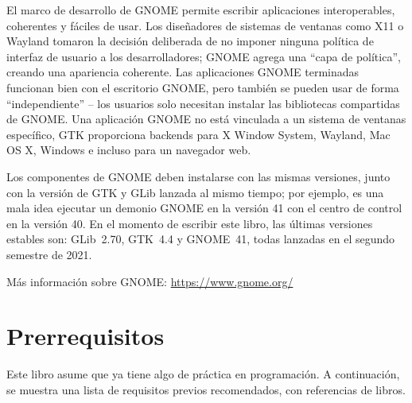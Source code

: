 El marco de desarrollo de GNOME permite escribir aplicaciones interoperables, coherentes y fáciles de usar. Los diseñadores de sistemas de ventanas como X11 o Wayland tomaron la decisión deliberada de no imponer ninguna política de interfaz de usuario a los desarrolladores; GNOME agrega una ``capa de política'', creando una apariencia coherente. Las aplicaciones GNOME terminadas funcionan bien con el escritorio GNOME, pero también se pueden usar de forma ``independiente'' -- los usuarios solo necesitan instalar las bibliotecas compartidas de GNOME. Una aplicación GNOME no está vinculada a un sistema de ventanas específico, GTK proporciona backends para X Window System, Wayland, Mac OS X, Windows e incluso para un navegador web.

Los componentes de GNOME deben instalarse con las mismas versiones, junto con la versión de GTK y GLib lanzada al mismo tiempo; por ejemplo, es una mala idea ejecutar un demonio GNOME en la versión 41 con el centro de control en la versión 40. En el momento de escribir este libro, las últimas versiones estables son: GLib~2.70, GTK~4.4 y GNOME~41, todas lanzadas en el segundo semestre de 2021. 

Más información sobre GNOME: \url{https://www.gnome.org/}

\section{Prerrequisitos}

Este libro asume que ya tiene algo de práctica en programación. A continuación, se muestra una lista de requisitos previos recomendados, con referencias de libros.


